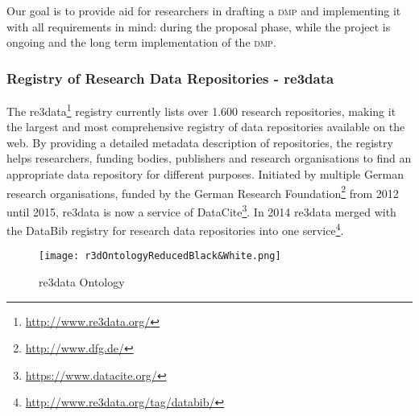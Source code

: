 \documentclass[runningheads,a4paper]{llncs}
\newcommand{\dmp}{{\scshape dmp}\xspace}
\newcommand\footnoteurl[1]{\footnote{\scriptsize\url{#1}}}
\begin{document}
Our goal is to provide aid for researchers in drafting a \dmp and implementing it with all requirements in mind: during the proposal phase, while the project is ongoing and the long term implementation of the \dmp.

\subsubsection{Registry of Research Data Repositories - re3data}
\label{requRe3}
The re3data\footnoteurl{http://www.re3data.org/} registry currently lists over 1.600 research repositories, making it the largest and most comprehensive registry of data repositories available on the web. By providing a detailed metadata description of repositories, the registry helps researchers, funding bodies, publishers and research organisations to find an appropriate data repository for different purposes\cite{PAMPLE2013}. Initiated by multiple German research organisations, funded by the German Research Foundation\footnoteurl{http://www.dfg.de/} from 2012 until 2015, re3data is now a service of DataCite\footnoteurl{https://www.datacite.org/}.
In 2014 re3data merged with the DataBib registry for research data repositories into one service\footnoteurl{http://www.re3data.org/tag/databib/}.


\begin{figure}
\centering
\texttt{[image: r3dOntologyReducedBlack\&White.png]}
  \caption{re3data Ontology}
  \label{fig:r3d}
  \vspace{-1.5em}
\end{figure}
\end{document}
